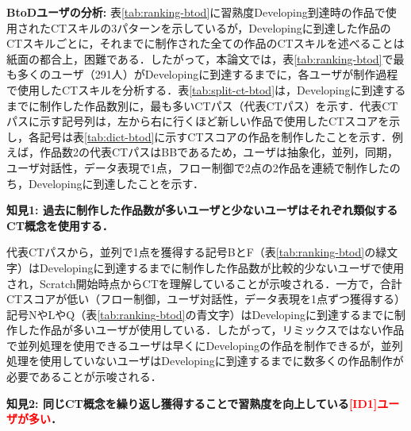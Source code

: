 \documentclass[submit,ses,noauthor]{ipsj}
\begin{document}
\noindent\textbf{BtoDユーザの分析:} 表\ref{tab:ranking-btod}に習熟度Developing到達時の作品で使用されたCTスキルの3パターンを示しているが，Developingに到達した作品のCTスキルごとに，それまでに制作された全ての作品のCTスキルを述べることは紙面の都合上，困難である．したがって，本論文では，表\ref{tab:ranking-btod}で最も多くのユーザ（291人）がDevelopingに到達するまでに，各ユーザが制作過程で使用したCTスキルを分析する．表\ref{tab:split-ct-btod}は，Developingに到達するまでに制作した作品数別に，最も多いCTパス（代表CTパス）を示す．代表CTパスに示す記号列は，左から右に行くほど新しい作品で使用したCTスコアを示し，各記号は表\ref{tab:dict-btod}に示すCTスコアの作品を制作したことを示す．例えば，作品数2の代表CTパスはBBであるため，ユーザは抽象化，並列，同期，ユーザ対話性，データ表現で1点，フロー制御で2点の2作品を連続で制作したのち，Developingに到達したことを示す．




\noindent\textbf{知見1: 過去に制作した作品数が多いユーザと少ないユーザはそれぞれ類似するCT概念を使用する．}

代表CTパスから，並列で1点を獲得する記号BとF（表\ref{tab:ranking-btod}の緑文字）はDevelopingに到達するまでに制作した作品数が比較的少ないユーザで使用され，Scratch開始時点からCTを理解していることが示唆される．一方で，合計CTスコアが低い（フロー制御，ユーザ対話性，データ表現を1点ずつ獲得する）記号NやLやQ（表\ref{tab:ranking-btod}の青文字）はDevelopingに到達するまでに制作した作品が多いユーザが使用している．したがって，リミックスではない作品で並列処理を使用できるユーザは早くにDevelopingの作品を制作できるが，並列処理を使用していないユーザはDevelopingに到達するまでに数多くの作品制作が必要であることが示唆される．

\noindent\textbf{知見2: 同じCT概念を繰り返し獲得することで習熟度を向上している\textcolor{red}{[ID1]ユーザが多い}．}
\end{document}
